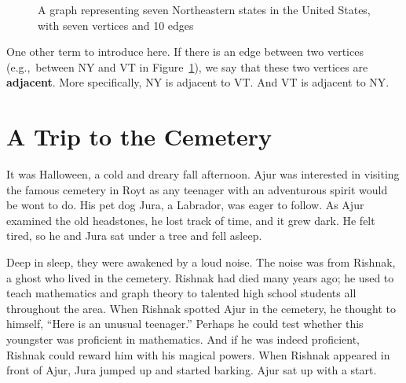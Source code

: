 \begin{figure}
\begin{center}
\caption{A graph representing seven Northeastern states in the United States, with seven vertices and 10 edges}\label{1g3}
\end{center}
\end{figure}

One other term to introduce here. If there is an edge between two vertices (e.g.,~between NY and VT in Figure~\ref{1g3}), we say that these two vertices are \textbf{adjacent}. More specifically, NY is adjacent to VT. And VT is adjacent to NY.

   

\chapter{A Trip to the Cemetery}
It was Halloween, a cold and dreary fall afternoon. Ajur was interested in visiting the famous cemetery in Royt as any teenager with an adventurous spirit would be wont to do. His pet dog Jura, a Labrador, was eager to follow. As Ajur examined the old headstones, he lost track of time, and it grew dark. He felt tired, so he and Jura sat under a tree and fell asleep.

Deep in sleep, they were awakened by a loud noise. The noise was from Rishnak, a ghost who lived in the cemetery. Rishnak had died many years ago; he used to teach mathematics and graph theory to talented high school students all throughout the area. When Rishnak spotted Ajur in the cemetery, he thought to himself, ``Here is an unusual teenager.'' Perhaps he could test whether this youngster was proficient in mathematics. And if he was indeed proficient, Rishnak could reward him with his magical powers. When Rishnak appeared in front of Ajur, Jura jumped up and started barking. Ajur sat up with a start.


